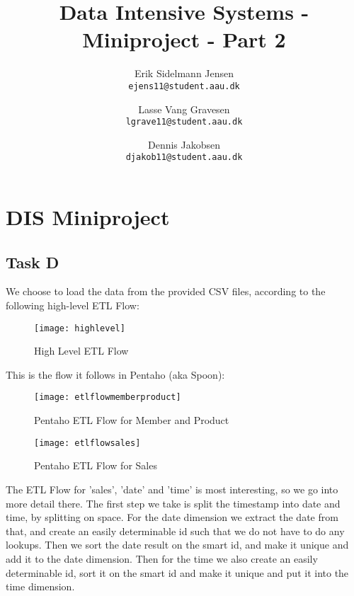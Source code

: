 

\author{
  Erik Sidelmann Jensen\\
  \texttt{ejens11@student.aau.dk}
  \and
  Lasse Vang Gravesen\\
  \texttt{lgrave11@student.aau.dk}
  \and
  Dennis Jakobsen\\
  \texttt{djakob11@student.aau.dk}  
}

\title{Data Intensive Systems - Miniproject - Part 2}
\date{}


	\clearpage\maketitle
	\thispagestyle{empty}
	
	\chapter{DIS Miniproject}
	\section{Task D}
    We choose to load the data from the provided CSV files, according to the following high-level ETL Flow:
    \begin{figure}[H]
    \begin{center}
    \texttt{[image: highlevel]}
    \caption{High Level ETL Flow}
    \label{fig:HighLevelETLFlow}
    \end{center}
    \end{figure}  
    
    This is the flow it follows in Pentaho (aka Spoon):
    
    \begin{figure}[H]
    \begin{center}
    \texttt{[image: etlflowmemberproduct]}
    \caption{Pentaho ETL Flow for Member and Product}
    \label{fig:PentahoETLFlowMemberAndProduct}
    \end{center}
    \end{figure}
    
    \begin{figure}[H]
    \begin{center}
    \texttt{[image: etlflowsales]}
    \caption{Pentaho ETL Flow for Sales}
    \label{fig:PentahoETLFlowSales}
    \end{center}
    \end{figure}
       
    The ETL Flow for 'sales', 'date' and 'time' is most interesting, so we go into more detail there. The first step we take is split the timestamp into date and time, by splitting on space. For the date dimension we extract the date from that, and create an easily determinable id such that we do not have to do any lookups. Then we sort the date result on the smart id, and make it unique and add it to the date dimension. Then for the time we also create an easily determinable id, sort it on the smart id and make it unique and put it into the time dimension.
    
